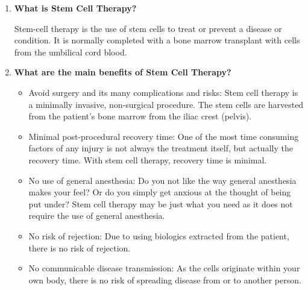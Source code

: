 \documentclass[a4paper]{article}
\begin{document}
\begin{enumerate}
    \item \textbf{What is Stem Cell Therapy? \cite{Mahla2016}}
   
Stem-cell therapy is the use of stem cells to treat or prevent a disease or condition. It is normally completed with a bone marrow transplant with cells from the umbilical cord blood. 

    \item \textbf{What are the main benefits of Stem Cell Therapy? \cite{Drparkercom2017} }

\begin{itemize}
	\item Avoid surgery and its many complications and risks: Stem cell therapy is a minimally invasive, non-surgical procedure. The stem cells are harvested from the patient’s bone marrow from the iliac crest (pelvis).
	\item Minimal post-procedural recovery time: One of the most time consuming factors of any injury is not always the treatment itself, but actually the recovery time. With stem cell therapy, recovery time is minimal.
	\item No use of general anesthesia: Do you not like the way general anesthesia makes your feel? Or do you simply get anxious at the thought of being put under? Stem cell therapy may be just what you need as it does not require the use of general anesthesia.
	\item No risk of rejection: Due to using biologics extracted from the patient, there is no risk of rejection.
	\item No communicable disease transmission: As the cells originate within your own body, there is no risk of spreading disease from or to another person.
\end{itemize}


\end{enumerate}
\end{document}

